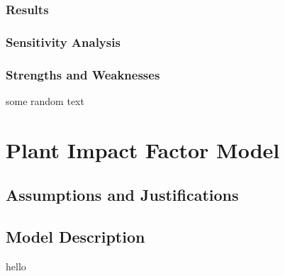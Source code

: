 \documentclass[12pt]{article}
\begin{document}
		\subsubsection{Results}
		
		\subsubsection{Sensitivity Analysis}
		
		\subsubsection{Strengths and Weaknesses}
	
			some random text
		
\section{Plant Impact Factor Model}

	\subsection{Assumptions and Justifications}
	
	\subsection{Model Description}

		hello
		
\end{document}
